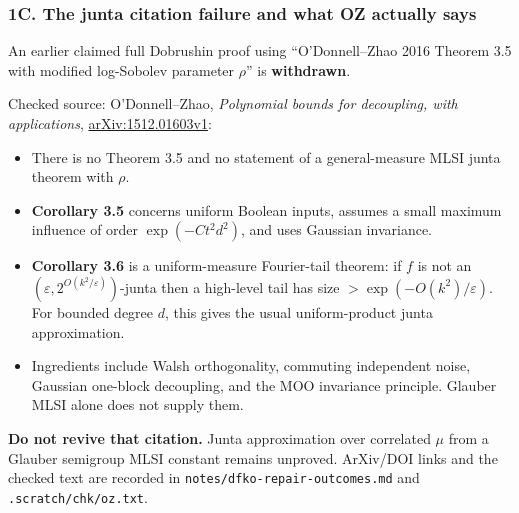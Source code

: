 \subsubsection{1C. The junta citation failure and what OZ actually says}\label{c.-the-junta-citation-failure-and-what-oz-actually-says}

An earlier claimed full Dobrushin proof using ``O'Donnell--Zhao 2016 Theorem 3.5 with modified log-Sobolev parameter \(\rho\)'' is \textbf{withdrawn}.

Checked source: O'Donnell--Zhao, \emph{Polynomial bounds for decoupling, with applications}, \href{https://arxiv.org/html/1512.01603v1}{arXiv:1512.01603v1}:

\begin{itemize}
\tightlist
\item
  There is no Theorem 3.5 and no statement of a general-measure MLSI junta theorem with \(\rho\).
\item
  \textbf{Corollary 3.5} concerns uniform Boolean inputs, assumes a small maximum influence of order \(\exp(-Ct^2d^2)\), and uses Gaussian invariance.
\item
  \textbf{Corollary 3.6} is a uniform-measure Fourier-tail theorem: if \(f\) is not an \((\varepsilon,2^{O(k^2/\varepsilon)})\)-junta then a high-level tail has size \(>\exp(-O(k^2)/\varepsilon)\). For bounded degree \(d\), this gives the usual uniform-product junta approximation.
\item
  Ingredients include Walsh orthogonality, commuting independent noise, Gaussian one-block decoupling, and the MOO invariance principle. Glauber MLSI alone does not supply them.
\end{itemize}

\textbf{Do not revive that citation.} Junta approximation over correlated \(\mu\) from a Glauber semigroup MLSI constant remains unproved. ArXiv/DOI links and the checked text are recorded in \texttt{notes/dfko-repair-outcomes.md} and \texttt{.scratch/chk/oz.txt}.
